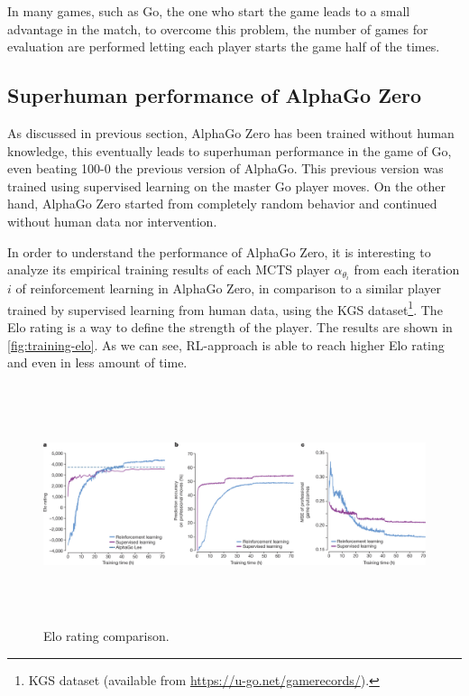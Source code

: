 \documentclass{article}
\begin{document}
In many games, such as Go, the one who start the game leads to a small advantage in the match, to overcome this problem, the number of games for evaluation are performed letting each player starts the game half of the times.

\subsection{Superhuman performance of AlphaGo Zero}
As discussed in previous section, AlphaGo Zero has been trained without human knowledge, this eventually leads to superhuman performance in the game of Go, even beating 100-0 the previous version of AlphaGo. This previous version was trained using supervised learning on the master Go player moves. On the other hand, AlphaGo Zero started from completely random behavior and continued without human data nor intervention.

In order to understand the performance of AlphaGo Zero, it is interesting to analyze its empirical training results of each MCTS player $\alpha_{\theta_i}$ from each iteration $i$ of reinforcement learning in AlphaGo Zero, in comparison to a similar player trained by supervised learning from human data, using the KGS dataset\footnote{KGS dataset (available from \url{https://u-go.net/gamerecords/}).}. The Elo rating is a way to define the strength of the player. The results are shown in  \autoref{fig:training-elo}. As we can see, RL-approach is able to reach higher Elo rating and even in less amount of time.

\begin{figure}[H]
	\centering
	\includegraphics[height=7cm,trim={0px 0px 1425px 45px},clip]{alpha-go-zero_empirical_results.png}
	\caption{Elo rating comparison. \cite{Silver_2016}}
	\label{fig:training-elo}
\end{figure}
\end{document}
